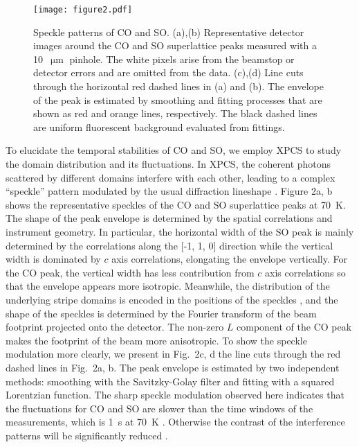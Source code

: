 \documentclass[aps,prl,showpacs,floatfix,twocolumn,superscriptaddress,longbibliography]{revtex4-1}
\def\um{\ensuremath{\upmu\text{m}}}
\begin{document}
\begin{figure}[t]
\texttt{[image: figure2.pdf]}
\caption{Speckle patterns of \gls{CO} and \gls{SO}. (a),(b) Representative detector images around the \gls{CO} and \gls{SO} superlattice peaks measured with a 10~{\um} pinhole. The white pixels arise from the beamstop or detector errors and are omitted from the data. (c),(d) Line cuts through the horizontal red dashed lines in (a) and (b). The envelope of the peak is estimated by smoothing and fitting processes that are shown as red and orange lines, respectively. The black dashed lines are uniform fluorescent background evaluated from fittings.}
\end{figure}

To elucidate the temporal stabilities of \gls{CO} and \gls{SO}, we employ \gls{XPCS} to study the domain distribution and its fluctuations. In \gls{XPCS}, the coherent photons scattered by different domains interfere with each other, leading to a complex ``speckle'' pattern modulated by the usual diffraction lineshape \cite{Brauer1995XPCS, Shpyrko2014XPCS, Chen2016LBCO, Thampy2017LBCO, Ricci2019LSNO, Lee2021Dimensionality}. Figure 2a, b shows the representative speckles of the \gls{CO} and \gls{SO} superlattice peaks at 70~K. The shape of the peak envelope is determined by the spatial correlations and instrument geometry. In particular, the horizontal width of the \gls{SO} peak is mainly determined by the correlations along the [-1, 1, 0] direction while the vertical width is dominated by $c$ axis correlations, elongating the envelope vertically. For the \gls{CO} peak, the vertical width has less contribution from $c$ axis correlations so that the envelope appears more isotropic. Meanwhile, the distribution of the underlying stripe domains is encoded in the positions of the speckles \cite{Chen2019LBCO}, and the shape of the speckles is determined by the Fourier transform of the beam footprint projected onto the detector. The non-zero $L$ component of the \gls{CO} peak makes the footprint of the beam more anisotropic. To show the speckle modulation more clearly, we present in Fig.~2c, d the line cuts through the red dashed lines in Fig.~2a, b. The peak envelope is estimated by two independent methods: smoothing with the Savitzky-Golay filter and fitting with a squared Lorentzian function. The sharp speckle modulation observed here indicates that the fluctuations for \gls{CO} and \gls{SO} are slower than the time windows of the measurements, which is 1~s at 70~K \cite{supp}. Otherwise the contrast of the interference patterns will be significantly reduced \cite{Chen2016LBCO}.
\end{document}

